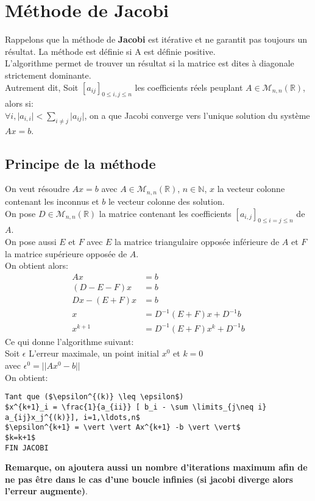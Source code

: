 \section{Méthode de Jacobi}
Rappelons que la méthode de \textbf{Jacobi} est itérative et ne garantit pas toujours un résultat. La méthode est définie si A est définie positive.\\
L'algorithme permet de trouver un résultat si la matrice est dites à diagonale strictement dominante. \\
Autrement dit, Soit $[a_{ij}]_{0 \leq i,j \leq n}$ les coefficients réels peuplant $A \in \mathcal{M}_{n,n} (\mathbb{R})$, alors si:\\
$\forall i, \vert a_{i,i} \vert <  \sum \limits_{i \neq j} \vert a_{ij} \vert$, on a que Jacobi converge vers l'unique solution du système $Ax=b$. 
\subsection{Principe de la méthode}
On veut résoudre $Ax=b$ avec $A \in \mathcal{M}_{n,n} (\mathbb{R})$, $n \in \mathbb{N}$, $x$ la vecteur colonne contenant les inconnus et $b$ le vecteur colonne des solution. \\
On pose $D \in \mathcal{M}_{n,n}(\mathbb{R})$ la matrice contenant les coefficients $[a_{i,j}]_{0 \leq i=j \leq n}$ de $A$. \\
On pose aussi $E$ et $F$ avec $E$ la matrice triangulaire opposée inférieure de $A$ et $F$ la matrice supérieure opposée de $A$.  \\
On obtient alors:
\begin{align}
Ax &=b \\
(D-E-F)x &= b \\
Dx -(E+F)x &= b \\
x &=D^{-1}(E+F)x+D^{-1}b \\
x^{k+1} &=D^{-1}(E+F)x^{k}+D^{-1}b 
\end{align}
Ce qui donne l'algorithme suivant: \\
Soit $\epsilon$ L'erreur maximale, un point initial $x^0$ et $k=0$ \\
avec $\epsilon^{0} = \vert \vert A x^0 -b \vert \vert$ \\
On obtient: 
\begin{lstlisting}[mathescape=true, frame=single]
Tant que ($\epsilon^{(k)} \leq \epsilon$)
$x^{k+1}_i = \frac{1}{a_{ii}} [ b_i - \sum \limits_{j\neq i} a_{ij}x_j^{(k)}], i=1,\ldots,n$
$\epsilon^{k+1} = \vert \vert Ax^{k+1} -b \vert \vert$
$k=k+1$
FIN JACOBI
\end{lstlisting}
\textbf{Remarque, on ajoutera aussi un nombre d'iterations maximum afin de ne pas être dans le cas d'une boucle infinies (si jacobi diverge alors l'erreur augmente)}.
